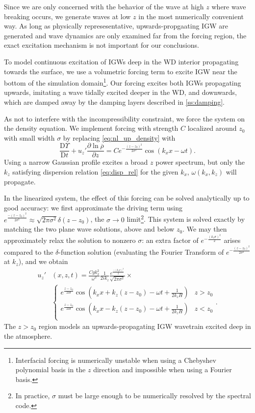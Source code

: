 \documentclass[
        fleqn,
        usenatbib,
    ]{mnras}
\newcommand*{\pd}[2]{\frac{\partial#1}{\partial#2}}
\newcommand*{\md}[2]{\frac{\mathrm{D}#1}{\mathrm{D}#2}}
\newcommand*{\p}[1]{\left(#1\right)}
\begin{document}
Since we are only concerned with the behavior of the wave at high $z$ where wave
breaking occurs, we generate waves at low $z$ in the most numerically convenient
way. As long as physically represesentative, upwards-propgaating IGW are
generated and wave dynamics are only examined far from the forcing region, the
exact excitation mechanism is not important for our conclusions.

To model continuous excitation of IGWs deep in the WD interior propagating
towards the surface, we use a volumetric forcing term to excite IGW near the
bottom of the simulation domain\footnote{Interfacial forcing is numerically
unstable when using a Chebyshev polynomial basis in the $z$ direction and
impossible when using a Fourier basis.}. Our forcing excites both IGWs
propagating upwards, imitating a wave tidally excited deeper in the WD, and
downwards, which are damped away by the damping layers described in
\autoref{ss:damping}.

As not to interfere with the incompressibility constraint, we force the system
on the density equation. We implement forcing with strength $C$ localized around
$z_0$ with small width $\sigma$ by replacing \autoref{eq:nl_up_density} with
\begin{equation}
    \md{\Upsilon}{t} + u_{z}'\pd{\ln \overline{\rho}}{z}
        = Ce^{-\frac{(z - z_0)^2}{2\sigma^2}}
            \cos \p{k_{x}x - \omega t}.\label{eq:vol_drive}
\end{equation}
Using a narrow Gaussian profile excites a broad $z$ power spectrum, but only the
$k_{z}$ satisfying dispersion relation \autoref{eq:disp_rel} for the given
$k_{x}$, $\omega(k_{x}, k_{z})$ will propagate.

In the linearized system, the effect of this forcing can be solved analytically
up to good accuracy: we first approximate the driving term using
$e^{\frac{-(z - z_0)^2}{2\sigma^2}} \approx \sqrt{2\pi \sigma^2}\delta(z -
z_0)$, the $\sigma \to 0$ limit\footnote{In practice, $\sigma$ must be large
enough to be numerically resolved by the spectral code.}. This system is solved
exactly by matching the two plane wave solutions, above and below $z_0$. We may
then approximately relax the solution to nonzero $\sigma$: an extra factor of
$e^{-\frac{(k_{z}\sigma)^2}{2}}$ arises compared to the $\delta$-function
solution (evaluating the Fourier Transform of $e^{-\frac{(z -
z_0)^2}{2\sigma^2}}$ at $k_z$), and we obtain
\begin{align}
    u_{z}'&(x, z, t) ={} \frac{Cgk_{x}^2}{\omega^2}
        \frac{1}{2ik_{z}}\frac{e^{\frac{-(k_{z}\sigma)^2}{2}}}
        {\sqrt{2\pi\sigma^2}} \times\nonumber\\
        &{}\begin{cases}
        e^{\frac{z - z_0}{2H}}\cos\p{k_{x}x + k_{z}(z - z_0) - \omega t
            + \frac{1}{2k_{z}H}}
            & z > z_0\\
        e^{\frac{z - z_0}{2H}}\cos\p{k_{x}x - k_{z}(z - z_0) - \omega t
            + \frac{1}{2k_{z}H}}
            & z < z_0\\
    \end{cases}.\label{eq:uz_lin}
\end{align}
The $z > z_0$ region models an upwards-propagating IGW wavetrain excited deep
in the atmosphere.
\end{document}
